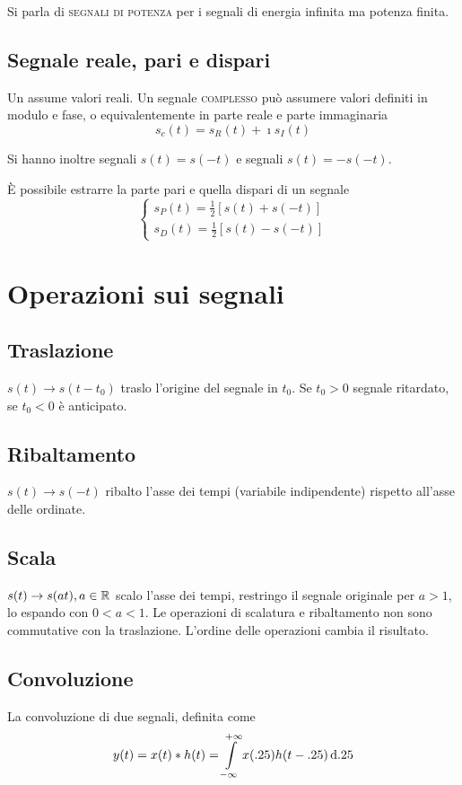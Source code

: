 Si parla di \textsc{segnali di potenza} per i segnali di energia infinita ma potenza finita.

\subsection{Segnale reale, pari e dispari}
Un  assume valori reali. Un segnale \textsc{complesso} può assumere valori definiti in modulo e fase, o equivalentemente in parte reale e parte immaginaria
\[s_c(t)=s_R(t)+\imath s_I(t)\]

Si hanno inoltre segnali  $s(t)=s(-t)$ e segnali  $s(t)=-s(-t)$.

\`{E} possibile estrarre la parte pari e quella dispari di un segnale
\[\begin{cases}
s_P(t)=\frac{1}{2}[s(t)+s(-t)] \\
s_D(t)=\frac{1}{2}[s(t)-s(-t)]
\end{cases}\]

\section{Operazioni sui segnali}
\subsection{Traslazione}
$s(t) \to s(t-t_0)$ traslo l'origine del segnale in $t_0$. Se $t_0>0$ segnale ritardato, se $t_0<0$ è anticipato.
\subsection{Ribaltamento}
$s(t) \to s(-t)$ ribalto l'asse dei tempi (variabile indipendente) rispetto all'asse delle ordinate.
\subsection{Scala}
$s(t)\to s(a t), a\in\mathbb{R}$ scalo l'asse dei tempi, restringo il segnale originale per $a>1$, lo espando con $0<a<1$.
Le operazioni di scalatura e ribaltamento non sono commutative con la traslazione. L'ordine delle operazioni cambia il risultato.
	\subsection{Convoluzione}
La convoluzione di due segnali, definita come
\[y(t)=x(t)\ast  h(t)=\int\limits_{-\infty}^{+\infty}{x(.25)h(t-.25)}{\,\mathop{}\!\mathrm{d}{.25}}\]
